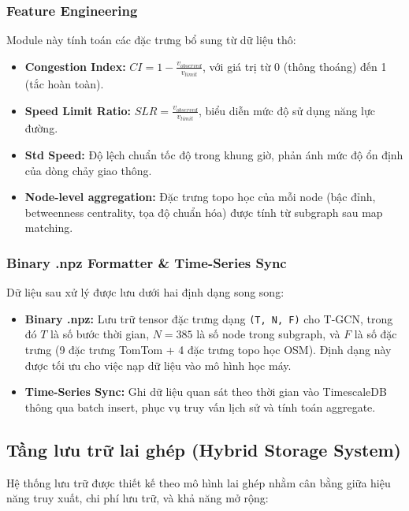 \subsubsection{Feature Engineering}
Module này tính toán các đặc trưng bổ sung từ dữ liệu thô:
\begin{itemize}
    \item \textbf{Congestion Index:} $CI = 1 - \frac{v_{observed}}{v_{limit}}$, với giá trị từ 0 (thông thoáng) đến 1 (tắc hoàn toàn).
    \item \textbf{Speed Limit Ratio:} $SLR = \frac{v_{observed}}{v_{limit}}$, biểu diễn mức độ sử dụng năng lực đường.
    \item \textbf{Std Speed:} Độ lệch chuẩn tốc độ trong khung giờ, phản ánh mức độ ổn định của dòng chảy giao thông.
    \item \textbf{Node-level aggregation:} Đặc trưng topo học của mỗi node (bậc đỉnh, betweenness centrality, tọa độ chuẩn hóa) được tính từ subgraph sau map matching.
\end{itemize}

\subsubsection{Binary .npz Formatter \& Time-Series Sync}
Dữ liệu sau xử lý được lưu dưới hai định dạng song song:
\begin{itemize}
    \item \textbf{Binary .npz:} Lưu trữ tensor đặc trưng dạng \texttt{(T, N, F)} cho T-GCN, trong đó $T$ là số bước thời gian, $N = 385$ là số node trong subgraph, và $F$ là số đặc trưng (9 đặc trưng TomTom + 4 đặc trưng topo học OSM). Định dạng này được tối ưu cho việc nạp dữ liệu vào mô hình học máy.
    \item \textbf{Time-Series Sync:} Ghi dữ liệu quan sát theo thời gian vào TimescaleDB thông qua batch insert, phục vụ truy vấn lịch sử và tính toán aggregate.
\end{itemize}

\subsection{Tầng lưu trữ lai ghép (Hybrid Storage System)}

Hệ thống lưu trữ được thiết kế theo mô hình lai ghép nhằm cân bằng giữa hiệu năng truy xuất, chi phí lưu trữ, và khả năng mở rộng:

